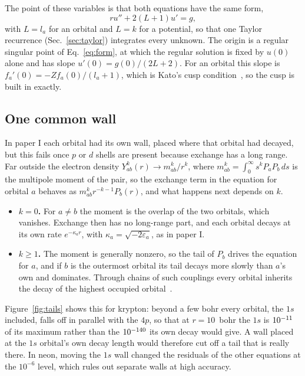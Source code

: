 \documentclass[aps,pra,reprint,superscriptaddress,amsmath,amssymb,longbibliography]{revtex4-2}
\begin{document}
The point of these variables is that both equations have the same form,
\begin{equation}
ru''+2(L+1)u'=g, \label{eq:form}
\end{equation}
with $L=l_a$ for an orbital and $L=k$ for a potential, so that one Taylor recurrence (Sec.~\ref{sec:taylor}) integrates every unknown. The origin is a regular singular point of Eq.~\eqref{eq:form}, at which the regular solution is fixed by $u(0)$ alone and has slope $u'(0)=g(0)/(2L+2)$. For an orbital this slope is $f_a'(0)=-Zf_a(0)/(l_a+1)$, which is Kato's cusp condition~\cite{Kato1957}, so the cusp is built in exactly.

\subsection{One common wall}\label{sec:wall}

In paper I each orbital had its own wall, placed where that orbital had decayed, but this fails once $p$ or $d$ shells are present because exchange has a long range. Far outside the electron density $Y^k_{ab}(r)\to m^k_{ab}/r^k$, where $m^k_{ab}=\int_0^\infty s^kP_aP_b\,ds$ is the multipole moment of the pair, so the exchange term in the equation for orbital $a$ behaves as $m^k_{ab}r^{-k-1}P_b(r)$, and what happens next depends on $k$.
\begin{itemize}
\item \textbf{$k=0$.} For $a\ne b$ the moment is the overlap of the two orbitals, which vanishes. Exchange then has no long-range part, and each orbital decays at its own rate $e^{-\kappa_ar}$, with $\kappa_a=\sqrt{-2\varepsilon_a}$, as in paper I.
\item \textbf{$k\ge1$.} The moment is generally nonzero, so the tail of $P_b$ drives the equation for $a$, and if $b$ is the outermost orbital its tail decays more slowly than $a$'s own and dominates. Through chains of such couplings every orbital inherits the decay of the highest occupied orbital~\cite{HMS1969,Handler1980,Ishida1992}.
\end{itemize}
Figure~\ref{fig:tails} shows this for krypton: beyond a few bohr every orbital, the $1s$ included, falls off in parallel with the $4p$, so that at $r=10$~bohr the $1s$ is $10^{-11}$ of its maximum rather than the $10^{-140}$ its own decay would give. A wall placed at the $1s$ orbital's own decay length would therefore cut off a tail that is really there. In neon, moving the $1s$ wall changed the residuals of the other equations at the $10^{-6}$ level, which rules out separate walls at high accuracy.
\end{document}
